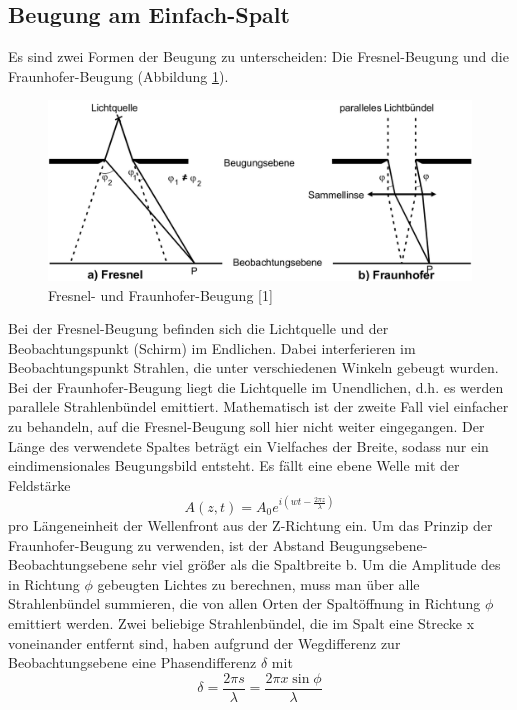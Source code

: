 \documentclass[11pt,ngerman,a4paper]{article}
\begin{document}
\subsection{Beugung am Einfach-Spalt}
Es sind zwei Formen der Beugung zu unterscheiden: Die Fresnel-Beugung und die Fraunhofer-Beugung (Abbildung \ref{abb1}).
\begin{figure}[H]
\centering
\includegraphics[scale=0.4]{abb1.png}
\caption{Fresnel- und Fraunhofer-Beugung [1]}
\label{abb1}
\end{figure}
\noindent
Bei der Fresnel-Beugung befinden sich die Lichtquelle und der Beobachtungspunkt (Schirm) im Endlichen. Dabei interferieren im Beobachtungspunkt Strahlen, die unter verschiedenen Winkeln gebeugt wurden. Bei der Fraunhofer-Beugung liegt die Lichtquelle im Unendlichen, d.h. es werden parallele Strahlenbündel emittiert. Mathematisch ist der zweite Fall viel einfacher zu behandeln, auf die Fresnel-Beugung soll hier nicht weiter eingegangen.
Der Länge des verwendete Spaltes beträgt ein Vielfaches der Breite, sodass nur ein eindimensionales Beugungsbild entsteht.
Es fällt eine ebene Welle mit der Feldstärke
\begin{equation}
A(z,t) = A_0 e^{i(wt- \frac{2\pi z}{ \lambda} )}
\end{equation}
pro Längeneinheit der Wellenfront aus der Z-Richtung ein.
Um das Prinzip der Fraunhofer-Beugung zu verwenden, ist der Abstand Beugungsebene-Beobachtungsebene sehr viel größer als die Spaltbreite b.\newline
Um die Amplitude des in Richtung $\phi$ gebeugten Lichtes zu berechnen, muss man über alle Strahlenbündel summieren, die von allen Orten der Spaltöffnung in Richtung $\phi$ emittiert werden. Zwei beliebige Strahlenbündel, die im Spalt eine Strecke x voneinander entfernt sind, haben aufgrund der Wegdifferenz zur Beobachtungsebene eine Phasendifferenz $\delta$ mit
\begin{equation}
\delta = \frac{2 \pi s}{\lambda} = \frac{2 \pi x \sin \phi}{\lambda}
\end{equation}
\end{document}
